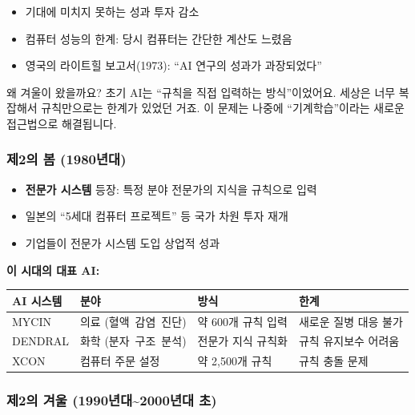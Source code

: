 \documentclass[11pt,a4paper]{article}
\renewcommand{\arraystretch}{1.4}
\begin{document}
\begin{itemize}[leftmargin=*]
    \item 기대에 미치지 못하는 성과  투자 감소
    \item 컴퓨터 성능의 한계: 당시 컴퓨터는 간단한 계산도 느렸음
    \item 영국의 라이트힐 보고서(1973): ``AI 연구의 성과가 과장되었다''
\end{itemize}

왜 겨울이 왔을까요? 초기 AI는 ``규칙을 직접 입력하는 방식''이었어요. 세상은 너무 복잡해서 규칙만으로는 한계가 있었던 거죠. 이 문제는 나중에 ``기계학습''이라는 새로운 접근법으로 해결됩니다.

\newpage

\subsubsection{ 제2의 봄 (1980년대)}

\begin{itemize}[leftmargin=*]
    \item \textbf{전문가 시스템} 등장: 특정 분야 전문가의 지식을 규칙으로 입력
    \item 일본의 ``5세대 컴퓨터 프로젝트'' 등 국가 차원 투자 재개
    \item 기업들이 전문가 시스템 도입  상업적 성과
\end{itemize}

\textbf{이 시대의 대표 AI:}

\begin{center}
\renewcommand{\arraystretch}{1.4}
\begin{tabular}{|l|l|p{3.8cm}|p{3cm}|}
\hline
\rowcolor{tableheader}
\textbf{AI 시스템} & \textbf{분야} & \textbf{방식} & \textbf{한계} \\
\hline
MYCIN & 의료 \mbox{(혈액 감염 진단)} & 약 600개 규칙 입력 & 새로운 질병 대응 불가 \\
\hline
DENDRAL & 화학 \mbox{(분자 구조 분석)} & 전문가 지식 규칙화 & 규칙 유지보수 어려움 \\
\hline
XCON & 컴퓨터 주문 설정 & 약 2,500개 규칙 & 규칙 충돌 문제 \\
\hline
\end{tabular}
\end{center}

\subsubsection{ 제2의 겨울 (1990년대\textasciitilde 2000년대 초)}
\end{document}
